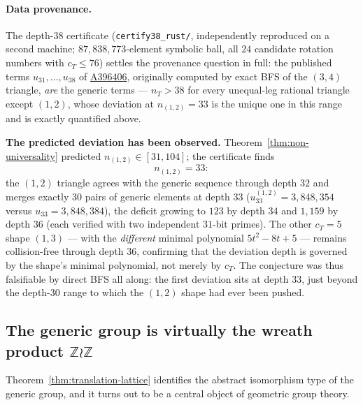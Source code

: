 \documentclass[11pt,a4paper]{article}
\theoremstyle{remark}
\theoremstyle{plain}
\begin{document}
\paragraph{Data provenance.}  The depth-$38$ certificate
(\texttt{certify38\_rust/}, independently reproduced on a second
machine; $87{,}838{,}773$-element symbolic ball, all $24$ candidate
rotation numbers with $c_T \le 76$) settles the provenance question in
full: the published terms $u_{31}, \ldots, u_{38}$ of
\href{https://oeis.org/A396406}{A396406}, originally computed by exact
BFS of the $(3,4)$ triangle, \emph{are} the generic terms ---
$n_T > 38$ for every unequal-leg rational triangle except $(1,2)$,
whose deviation at $n_{(1,2)} = 33$ is the unique one in this range and
is exactly quantified above.

\textbf{The predicted deviation has been observed.}
Theorem~\ref{thm:non-universality} predicted
$n_{(1,2)} \in [31, 104]$; the certificate finds
\[
n_{(1,2)} = 33:
\]
the $(1,2)$ triangle agrees with the generic sequence through depth
$32$ and merges exactly $30$ pairs of generic elements at depth $33$
($u_{33}^{(1,2)} = 3{,}848{,}354$ versus $u_{33} = 3{,}848{,}384$), the
deficit growing to $123$ by depth $34$ and $1{,}159$ by depth $36$
(each verified with two independent $31$-bit primes).  The other
$c_T = 5$ shape $(1,3)$ --- with the \emph{different} minimal
polynomial $5t^2 - 8t + 5$ --- remains collision-free through depth
$36$, confirming that the deviation depth is governed by the shape's
minimal polynomial, not merely by $c_T$.  The conjecture was thus
falsifiable by direct BFS all along: the first deviation sits at depth
$33$, just beyond the depth-$30$ range to which the $(1,2)$ shape had
ever been pushed.

\subsection{The generic group is virtually the wreath product
$\mathbb{Z} \wr \mathbb{Z}$}
\label{ssec:lamplighter}

Theorem~\ref{thm:translation-lattice} identifies the abstract
isomorphism type of the generic group, and it turns out to be a central
object of geometric group theory.
\end{document}
